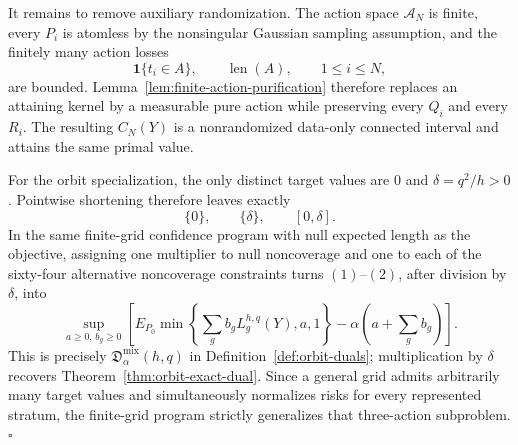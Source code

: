 It remains to remove auxiliary randomization.  The action space
\(\mathcal A_N\) is finite, every \(P_i\) is atomless by the nonsingular
Gaussian sampling assumption, and the finitely many action losses
\[
 \mathbf1\{t_i\in A\},\qquad \operatorname{len}(A),
 \qquad 1\leq i\leq N,
\]
are bounded.  Lemma~\ref{lem:finite-action-purification} therefore replaces an
attaining kernel by a measurable pure action while preserving every
\(Q_i\) and every \(R_i\).  The resulting \(C_N(Y)\) is a nonrandomized
data-only connected interval and attains the same primal value.

For the orbit specialization, the only distinct target values are
\(0\) and \(\delta=q^2/h>0\).  Pointwise shortening therefore leaves exactly
\[
 \{0\},\qquad \{\delta\},\qquad [0,\delta].
\]
In the same finite-grid confidence program with null expected length as the
objective, assigning one multiplier to null noncoverage and one to each of the
sixty-four alternative noncoverage constraints turns \((1)\)--\((2)\), after
division by \(\delta\), into
\[
 \sup_{a\geq0,\,b_g\geq0}
 \left[
 E_{P_0}\min\left\{\sum_gb_gL_g^{h,q}(Y),a,1\right\}
 -\alpha\left(a+\sum_gb_g\right)
 \right].
\]
This is precisely \(\mathfrak D_\alpha^{\mathrm{mix}}(h,q)\) in
Definition~\ref{def:orbit-duals}; multiplication by \(\delta\) recovers
Theorem~\ref{thm:orbit-exact-dual}.  Since a general grid admits arbitrarily
many target values and simultaneously normalizes risks for every represented
stratum, the finite-grid program strictly generalizes that three-action
subproblem. \(\square\)